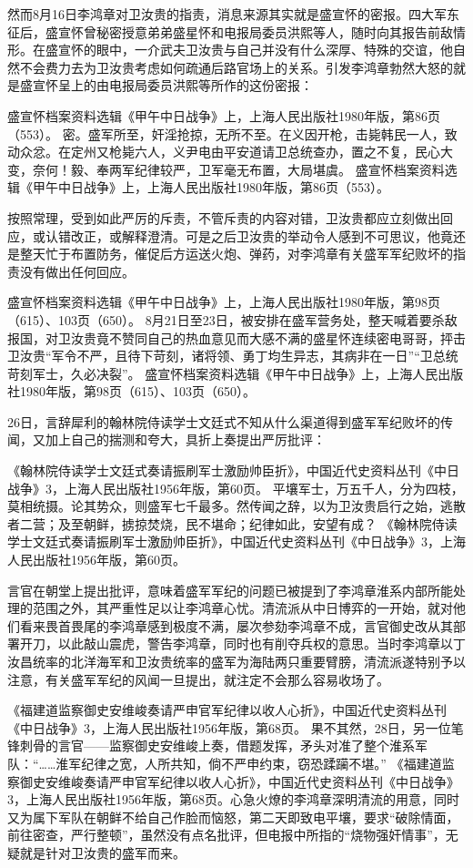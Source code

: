 \documentclass[12pt,UTF8]{ctexbook}
\begin{document}
然而8月16日李鸿章对卫汝贵的指责，消息来源其实就是盛宣怀的密报。四大军东征后，盛宣怀曾秘密授意弟弟盛星怀和电报局委员洪熙等人，随时向其报告前敌情形。在盛宣怀的眼中，一介武夫卫汝贵与自己并没有什么深厚、特殊的交谊，他自然不会费力去为卫汝贵考虑如何疏通后路官场上的关系。引发李鸿章勃然大怒的就是盛宣怀呈上的由电报局委员洪熙等所作的这份密报：

盛宣怀档案资料选辑《甲午中日战争》上，上海人民出版社1980年版，第86页（553）。
密。盛军所至，奸淫抢掠，无所不至。在义因开枪，击毙韩民一人，致动众忿。在定州又枪毙六人，义尹电由平安道请卫总统查办，置之不复，民心大变，奈何！毅、奉两军纪律较严，卫军毫无布置，大局堪虞。 盛宣怀档案资料选辑《甲午中日战争》上，上海人民出版社1980年版，第86页（553）。

按照常理，受到如此严厉的斥责，不管斥责的内容对错，卫汝贵都应立刻做出回应，或认错改正，或解释澄清。可是之后卫汝贵的举动令人感到不可思议，他竟还是整天忙于布置防务，催促后方运送火炮、弹药，对李鸿章有关盛军军纪败坏的指责没有做出任何回应。

盛宣怀档案资料选辑《甲午中日战争》上，上海人民出版社1980年版，第98页（615）、103页（650）。
8月21日至23日，被安排在盛军营务处，整天喊着要杀敌报国，对卫汝贵竟不赞同自己的热血意见而大感不满的盛星怀连续密电哥哥，抨击卫汝贵“军令不严，且待下苛刻，诸将领、勇丁均生异志，其病非在一日”“卫总统苛刻军士，久必决裂”。 盛宣怀档案资料选辑《甲午中日战争》上，上海人民出版社1980年版，第98页（615）、103页（650）。

26日，言辞犀利的翰林院侍读学士文廷式不知从什么渠道得到盛军军纪败坏的传闻，又加上自己的揣测和夸大，具折上奏提出严厉批评：

《翰林院侍读学士文廷式奏请振刷军士激励帅臣折》，中国近代史资料丛刊《中日战争》3，上海人民出版社1956年版，第60页。
平壤军士，万五千人，分为四枝，莫相统摄。论其势众，则盛军七千最多。然传闻之辞，以为卫汝贵启行之始，逃散者二营；及至朝鲜，掳掠焚烧，民不堪命；纪律如此，安望有成？ 《翰林院侍读学士文廷式奏请振刷军士激励帅臣折》，中国近代史资料丛刊《中日战争》3，上海人民出版社1956年版，第60页。

言官在朝堂上提出批评，意味着盛军军纪的问题已被提到了李鸿章淮系内部所能处理的范围之外，其严重性足以让李鸿章心忧。清流派从中日博弈的一开始，就对他们看来畏首畏尾的李鸿章感到极度不满，屡次参劾李鸿章不成，言官御史改从其部署开刀，以此敲山震虎，警告李鸿章，同时也有削夺兵权的意思。当时李鸿章以丁汝昌统率的北洋海军和卫汝贵统率的盛军为海陆两只重要臂膀，清流派遂特别予以注意，有关盛军军纪的风闻一旦提出，就注定不会那么容易收场了。

《福建道监察御史安维峻奏请严申官军纪律以收人心折》，中国近代史资料丛刊《中日战争》3，上海人民出版社1956年版，第68页。
果不其然，28日，另一位笔锋刺骨的言官——监察御史安维峻上奏，借题发挥，矛头对准了整个淮系军队：“……淮军纪律之宽，人所共知，倘不严申约束，窃恐蹂躏不堪。” 《福建道监察御史安维峻奏请严申官军纪律以收人心折》，中国近代史资料丛刊《中日战争》3，上海人民出版社1956年版，第68页。心急火燎的李鸿章深明清流的用意，同时又为属下军队在朝鲜不给自己作脸而恼怒，第二天即致电平壤，要求“破除情面，前往密查，严行整顿”，虽然没有点名批评，但电报中所指的“烧物强奸情事”，无疑就是针对卫汝贵的盛军而来。
\end{document}

